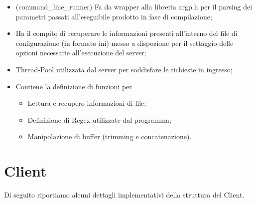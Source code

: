 \begin{minipage}{0.45\textwidth}
\begin{itemize}
        \item {} (command\_line\_runner) \rightarrow Fa da wrapper alla libreria argp.h per il parsing dei parametri passati all’eseguibile prodotto in fase di compilazione;
        \item {} \rightarrow Ha il compito di recuperare le informazioni presenti all’interno del file di configurazione (in formato ini) messo a dispozione per il settaggio delle opzioni necessarie all’esecuzione del server;
        \item {} \rightarrow Thread-Pool utilizzata dal server per soddisfare le richieste in ingresso;
        \item {} \rightarrow Contiene la definizione di funzioni per \begin{itemize} \item Lettura e recupero informazioni di file; \item Definizione di Regex utilizzate dal programma; \item Manipolazione di buffer (trimming e concatenazione). \end{itemize}
      \end{itemize}

    \end{minipage}

    \newpage
  \section{Client}
    Di seguito riportiamo alcuni dettagli implementativi della struttura del Client.
    \newpage
